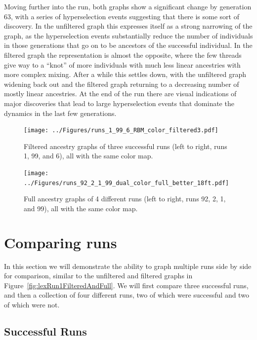 \documentclass{sig-alternate}
\begin{document}
Moving further into the run, both graphs show a significant change by generation 63, with a series of
hyperselection events suggesting that there is some sort of discovery. In the
unfiltered graph this expresses itself as a strong narrowing of the graph, as
the hyperselection events substantially reduce the number of individuals in
those generations that go on to be ancestors of the successful individual. In
the filtered graph the representation is almost the opposite, where the few
threads give way to a ``knot'' of more individuals with much less linear 
ancestries with more complex mixing. After a while this settles down, with the
unfiltered graph widening back out and the filtered graph returning to a
decreasing number of mostly linear ancestries. At the end of the run there are
visual indications of major discoveries that lead to large hyperselection events that
dominate the dynamics in the last few generations.

\begin{figure}
	\begin{center}
		\texttt{[image: ../Figures/runs\_1\_99\_6\_RBM\_color\_filtered3.pdf]}
	\end{center}
	\caption{Filtered ancestry graphs of three successful runs (left to right, runs 1, 99, and 6), all with the same color map.}
	\label{fig:runs1:99:6:filtered}
\end{figure}

\begin{figure}
	\begin{center}
		\texttt{[image: ../Figures/runs\_92\_2\_1\_99\_dual\_color\_full\_better\_18ft.pdf]}
	\end{center}
	\caption{Full ancestry graphs of 4 different runs (left to right, runs 92, 2, 1, and 99), all with the same color map.}
	\label{fig:runs92:2:1:99:filtered}
\end{figure}

\section{Comparing runs}
\label{sec:comparisons}

In this section we will demonstrate the ability to graph multiple runs side by
side for comparison, similar to the unfiltered and filtered graphs in 
Figure~\ref{fig:lexRun1FilteredAndFull}. We will first compare three successful
runs, and then a collection of four different runs, two of which were successful 
and two of which were not.

\subsection{Successful Runs}
\end{document}
